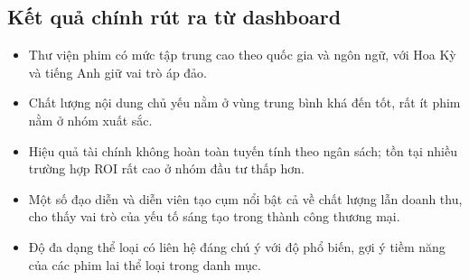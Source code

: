 \subsection{Kết quả chính rút ra từ dashboard}
\begin{itemize}[leftmargin=2em]
    \item Thư viện phim có mức tập trung cao theo quốc gia và ngôn ngữ, với Hoa Kỳ và tiếng Anh giữ vai trò áp đảo.
    \item Chất lượng nội dung chủ yếu nằm ở vùng trung bình khá đến tốt, rất ít phim nằm ở nhóm xuất sắc.
    \item Hiệu quả tài chính không hoàn toàn tuyến tính theo ngân sách; tồn tại nhiều trường hợp ROI rất cao ở nhóm đầu tư thấp hơn.
    \item Một số đạo diễn và diễn viên tạo cụm nổi bật cả về chất lượng lẫn doanh thu, cho thấy vai trò của yếu tố sáng tạo trong thành công thương mại.
    \item Độ đa dạng thể loại có liên hệ đáng chú ý với độ phổ biến, gợi ý tiềm năng của các phim lai thể loại trong danh mục.
\end{itemize}
